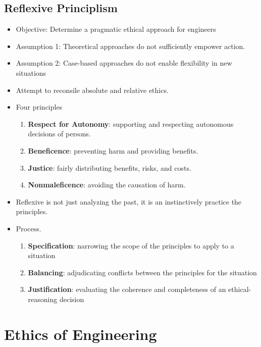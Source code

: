 \documentclass[a4paper]{article}
\numberwithin{equation}{section}
\begin{document}
\subsection{Reflexive Principlism}
\begin{itemize}
    \item Objective: Determine a pragmatic ethical approach for engineers
    \item Assumption 1: Theoretical approaches do not sufficiently empower action.
    \item Assumption 2: Case-based approaches do not enable flexibility in new situations
    \item Attempt to reconsile absolute and relative ethics. 
    \item Four principles
    \begin{enumerate}
        \item \textbf{Respect for Autonomy}: supporting and respecting autonomous decisions of persons.
        \item \textbf{Beneficence}: preventing harm and providing benefits.
        \item \textbf{Justice}: fairly distributing benefits, risks, and costs.
        \item \textbf{Nonmaleficence}: avoiding the causation of harm.
    \end{enumerate}
    \item Reflexive is not just analyzing the past, it is an instinctively practice the principles.
    \item Process.
    \begin{enumerate}
        \item \textbf{Specification}: narrowing the scope of the principles to apply to a situation
        \item \textbf{Balancing}: adjudicating conflicts between the principles for the situation
        \item \textbf{Justification}: evaluating the coherence and completeness of an ethical-reasoning decision
    \end{enumerate}
\end{itemize}


\section{Ethics of Engineering}
\end{document}
